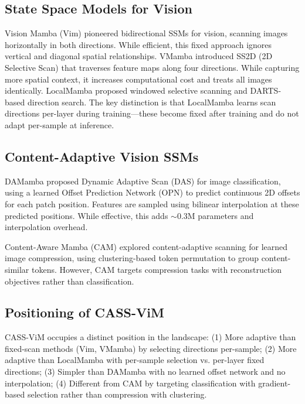 \documentclass{article}
\begin{document}
\subsection{State Space Models for Vision}

Vision Mamba (Vim) \cite{zhu2024vision} pioneered bidirectional SSMs for vision, scanning images horizontally in both directions. While efficient, this fixed approach ignores vertical and diagonal spatial relationships. VMamba \cite{liu2024vmamba} introduced SS2D (2D Selective Scan) that traverses feature maps along four directions. While capturing more spatial context, it increases computational cost and treats all images identically. LocalMamba \cite{huang2024localmamba} proposed windowed selective scanning and DARTS-based direction search. The key distinction is that LocalMamba learns scan directions per-layer during training---these become fixed after training and do not adapt per-sample at inference.

\subsection{Content-Adaptive Vision SSMs}

DAMamba \cite{li2025damamba} proposed Dynamic Adaptive Scan (DAS) for image classification, using a learned Offset Prediction Network (OPN) to predict continuous 2D offsets for each patch position. Features are sampled using bilinear interpolation at these predicted positions. While effective, this adds $\sim$0.3M parameters and interpolation overhead.

Content-Aware Mamba (CAM) \cite{chen2025content} explored content-adaptive scanning for learned image compression, using clustering-based token permutation to group content-similar tokens. However, CAM targets compression tasks with reconstruction objectives rather than classification.

\subsection{Positioning of CASS-ViM}

CASS-ViM occupies a distinct position in the landscape: (1) More adaptive than fixed-scan methods (Vim, VMamba) by selecting directions per-sample; (2) More adaptive than LocalMamba with per-sample selection vs. per-layer fixed directions; (3) Simpler than DAMamba with no learned offset network and no interpolation; (4) Different from CAM by targeting classification with gradient-based selection rather than compression with clustering.
\end{document}
